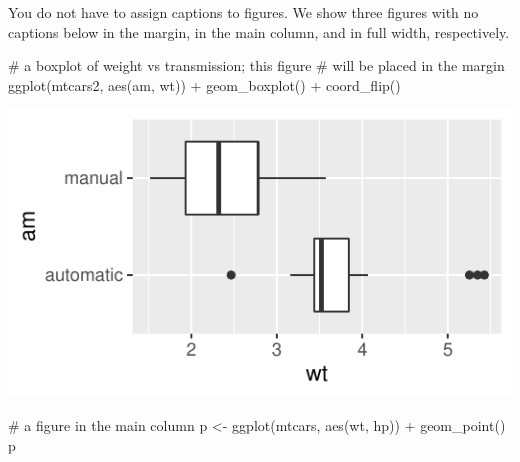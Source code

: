 \documentclass[
  letterpaper,
  DIV=11,
  numbers=noendperiod,
  oneside]{scrartcl}
\newenvironment{Shaded}{\begin{snugshade}}{\end{snugshade}}
\newcommand{\CommentTok}[1]{\textcolor[rgb]{0.37,0.37,0.37}{#1}}
\newcommand{\FunctionTok}[1]{\textcolor[rgb]{0.28,0.35,0.67}{#1}}
\newcommand{\NormalTok}[1]{\textcolor[rgb]{0.00,0.23,0.31}{#1}}
\newcommand{\OtherTok}[1]{\textcolor[rgb]{0.00,0.23,0.31}{#1}}
\newcommand{\SpecialCharTok}[1]{\textcolor[rgb]{0.37,0.37,0.37}{#1}}
\begin{document}
You do not have to assign captions to figures. We show three figures
with no captions below in the margin, in the main column, and in full
width, respectively.

\begin{Shaded}
\begin{Highlighting}[]
\CommentTok{\# a boxplot of weight vs transmission; this figure}
\CommentTok{\# will be placed in the margin}
\FunctionTok{ggplot}\NormalTok{(mtcars2, }\FunctionTok{aes}\NormalTok{(am, wt)) }\SpecialCharTok{+} \FunctionTok{geom\_boxplot}\NormalTok{() }\SpecialCharTok{+}
  \FunctionTok{coord\_flip}\NormalTok{()}
\end{Highlighting}
\end{Shaded}

\begin{marginfigure}

{\centering \includegraphics{cv_files/figure-pdf/unnamed-chunk-11-1.pdf}

}

\end{marginfigure}

\begin{Shaded}
\begin{Highlighting}[]
\CommentTok{\# a figure in the main column}
\NormalTok{p }\OtherTok{\textless{}{-}} \FunctionTok{ggplot}\NormalTok{(mtcars, }\FunctionTok{aes}\NormalTok{(wt, hp)) }\SpecialCharTok{+} \FunctionTok{geom\_point}\NormalTok{()}
\NormalTok{p}
\end{Highlighting}
\end{Shaded}
\end{document}
